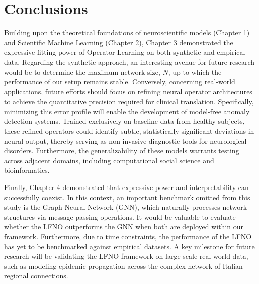 
\chapter*{\label{ch:conclusions}Conclusions}

Building upon the theoretical foundations of neuroscientific models (Chapter 1) and Scientific Machine Learning (Chapter 2), Chapter 3 demonstrated the expressive fitting power of Operator Learning on both synthetic and empirical data. Regarding the synthetic approach, an interesting avenue for future research would be to determine the maximum network size, $N$, up to which the performance of our setup remains stable. Conversely, concerning real-world applications, future efforts should focus on refining neural operator architectures to achieve the quantitative precision required for clinical translation. Specifically, minimizing this error profile will enable the development of model-free anomaly detection systems. Trained exclusively on baseline data from healthy subjects, these refined operators could identify subtle, statistically significant deviations in neural output, thereby serving as non-invasive diagnostic tools for neurological disorders. Furthermore, the generalizability of these models warrants testing across adjacent domains, including computational social science and bioinformatics.

Finally, Chapter 4 demonstrated that expressive power and interpretability can successfully coexist. In this context, an important benchmark omitted from this study is the Graph Neural Network (GNN), which naturally processes network structures via message-passing operations. It would be valuable to evaluate whether the LFNO outperforms the GNN when both are deployed within our framework. Furthermore, due to time constraints, the performance of the LFNO has yet to be benchmarked against empirical datasets. A key milestone for future research will be validating the LFNO framework on large-scale real-world data, such as modeling epidemic propagation across the complex network of Italian regional connections.

